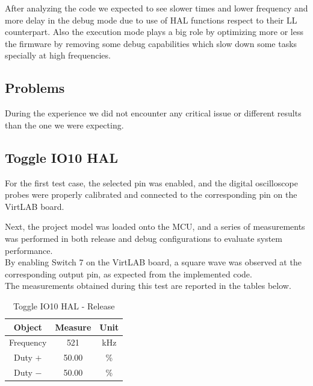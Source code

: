 \documentclass[../main.tex]{subfiles}
\begin{document}
After analyzing the code we expected to see slower times and lower frequency and more delay in the debug mode due to use of HAL functions respect to their LL counterpart.
Also the execution mode plays a big role by optimizing more or less the firmware by removing some debug capabilities which slow down some tasks specially at high frequencies.

\subsection*{Problems}

During the experience we did not encounter any critical issue or different results than the one we were expecting.




\subsection{Toggle IO10 HAL}

For the first test case, the selected pin was enabled, and the digital oscilloscope probes were properly calibrated and connected to the corresponding pin on the VirtLAB board.

Next, the project model was loaded onto the MCU, and a series of measurements was performed in both release and debug configurations to evaluate system performance.\\

By enabling Switch 7 on the VirtLAB board, a square wave was observed at the corresponding output pin, as expected from the implemented code.\\

The measurements obtained during this test are reported in the tables below.\\


\begin{table}[h]
\centering
\begin{tabular}{ccc}

\textbf{Object} & \textbf{Measure} & \textbf{Unit} \\
\hline
Frequency & 521 &  kHz \\
\hline
Duty $+$ & 50.00 & \% \\
\hline
Duty $-$ & 50.00 & \% \\

\end{tabular}
\caption{Toggle IO10 HAL - Release}
\label{tab:example}
\end{table}
\end{document}
